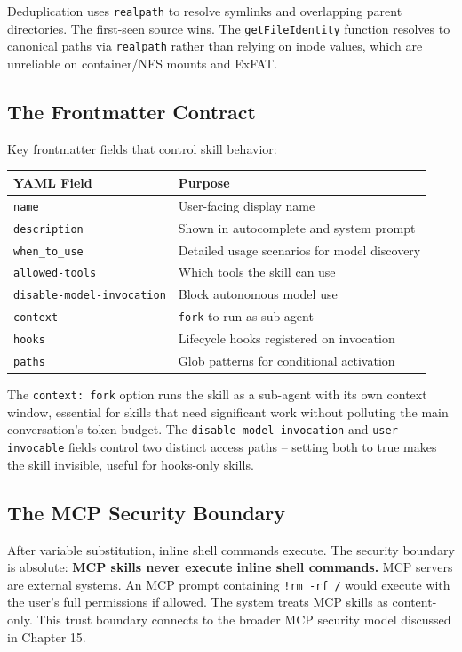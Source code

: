 \documentclass[
  english,
  11pt,
  letterpaper,
]{book}
\begin{document}
Deduplication uses \texttt{realpath} to resolve symlinks and overlapping
parent directories. The first-seen source wins. The
\texttt{getFileIdentity} function resolves to canonical paths via
\texttt{realpath} rather than relying on inode values, which are
unreliable on container/NFS mounts and ExFAT.

\subsection{The Frontmatter Contract}\label{the-frontmatter-contract}

Key frontmatter fields that control skill behavior:

\begin{longtable}[]{@{}ll@{}}
\toprule\noalign{}
YAML Field & Purpose \\
\midrule\noalign{}
\endhead
\bottomrule\noalign{}
\endlastfoot
\texttt{name} & User-facing display name \\
\texttt{description} & Shown in autocomplete and system prompt \\
\texttt{when\_to\_use} & Detailed usage scenarios for model discovery \\
\texttt{allowed-tools} & Which tools the skill can use \\
\texttt{disable-model-invocation} & Block autonomous model use \\
\texttt{context} & \texttt{\textquotesingle{}fork\textquotesingle{}} to
run as sub-agent \\
\texttt{hooks} & Lifecycle hooks registered on invocation \\
\texttt{paths} & Glob patterns for conditional activation \\
\end{longtable}

The \texttt{context:\ \textquotesingle{}fork\textquotesingle{}} option
runs the skill as a sub-agent with its own context window, essential for
skills that need significant work without polluting the main
conversation's token budget. The \texttt{disable-model-invocation} and
\texttt{user-invocable} fields control two distinct access paths --
setting both to true makes the skill invisible, useful for hooks-only
skills.

\subsection{The MCP Security Boundary}\label{the-mcp-security-boundary}

After variable substitution, inline shell commands execute. The security
boundary is absolute: \textbf{MCP skills never execute inline shell
commands.} MCP servers are external systems. An MCP prompt containing
\texttt{!\textasciigrave{}rm\ -rf\ /\textasciigrave{}} would execute
with the user's full permissions if allowed. The system treats MCP
skills as content-only. This trust boundary connects to the broader MCP
security model discussed in Chapter 15.
\end{document}
